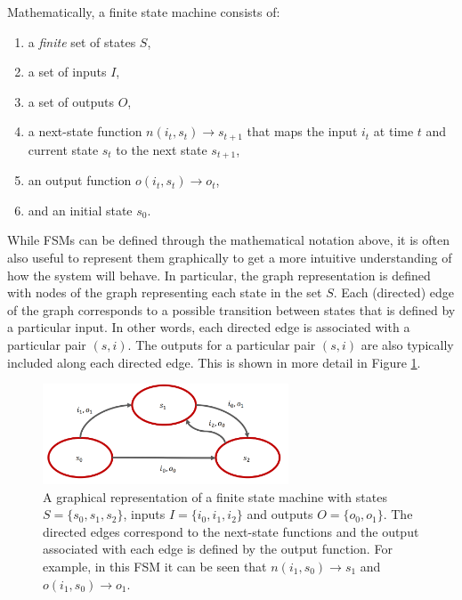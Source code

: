 Mathematically, a finite state machine consists of:
\begin{enumerate}
    \item a \textit{finite} set of states $S$,
    \item a set of inputs $I$,
    \item a set of outputs $O$,
    \item a next-state function $n(i_t, s_t) \xrightarrow{} s_{t+1}$ that maps the input $i_t$ at time $t$ and current state $s_t$ to the next state $s_{t+1}$,
    \item an output function $o(i_t, s_t) \xrightarrow{} o_t$,
    \item and an initial state $s_0$.
\end{enumerate}
While FSMs can be defined through the mathematical notation above, it is often also useful to represent them graphically to get a more intuitive understanding of how the system will behave. In particular, the graph representation is defined with nodes of the graph representing each state in the set $S$. Each (directed) edge of the graph corresponds to a possible transition between states that is defined by a particular input. In other words, each directed edge is associated with a particular pair $(s, i)$. The outputs for a particular pair $(s,i)$ are also typically included along each directed edge. This is shown in more detail in Figure \ref{fig:fsm}.
\begin{figure}[ht]
    \centering
    \includegraphics[width=0.65\textwidth]{tex/figs/ch19_figs/fsm.png}
    \caption{A graphical representation of a finite state machine with states $S = \{s_0, s_1, s_2\}$, inputs $I = \{i_0,i_1,i_2\}$ and outputs $O = \{o_0, o_1\}$. The directed edges correspond to the next-state functions and the output associated with each edge is defined by the output function. For example, in this FSM it can be seen that $n(i_1, s_0) \xrightarrow{} s_1$ and $o(i_1, s_0) \xrightarrow{} o_1$.}
    \label{fig:fsm}
\end{figure}

